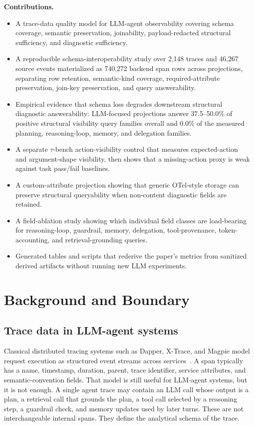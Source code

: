 \documentclass[conference]{IEEEtran}
\begin{document}
\textbf{Contributions.}
\begin{itemize}[nosep,leftmargin=*]
\item A trace-data quality model for LLM-agent observability covering
  schema coverage, semantic preservation, joinability, payload-redacted
  structural sufficiency, and diagnostic sufficiency.
\item A reproducible schema-interoperability study over 2,148 traces and
  46,267 source events materialized as 740,272 backend span rows across
  projections, separating row retention, semantic-kind coverage,
  required-attribute preservation, join-key preservation, and query
  answerability.
\item Empirical evidence that schema loss degrades downstream structural
  diagnostic answerability: LLM-focused projections answer
  37.5--50.0\% of positive structural visibility query families overall
  and 0.0\% of the measured planning, reasoning-loop, memory, and
  delegation families.
\item A separate $\tau$-bench action-visibility control that measures
  expected-action and argument-shape visibility, then shows that a
  missing-action proxy is weak against task pass/fail baselines.
\item A custom-attribute projection showing that generic OTel-style
  storage can preserve structural queryability when non-content
  diagnostic fields are retained.
\item A field-ablation study showing which individual field classes are
  load-bearing for reasoning-loop, guardrail, memory, delegation,
  tool-provenance, token-accounting, and retrieval-grounding queries.
\item Generated tables and scripts that rederive the paper's metrics
  from sanitized derived artifacts without running new LLM experiments.
\end{itemize}

\section{Background and Boundary}
\label{sec:background}

\subsection{Trace data in LLM-agent systems}

Classical distributed tracing systems such as Dapper, X-Trace, and
Magpie model request execution as structured event streams across
services~\cite{dapper,xtrace,magpie}. A span typically has a name,
timestamp, duration, parent, trace identifier, service attributes, and
semantic-convention fields. That model is still useful for LLM-agent
systems, but it is not enough. A single agent trace may contain an LLM
call whose output is a plan, a retrieval call that grounds the plan, a
tool call selected by a reasoning step, a guardrail check, and memory
updates used by later turns. These are not interchangeable internal
spans. They define the analytical schema of the trace.
\end{document}

